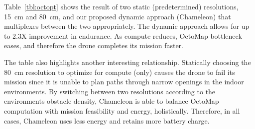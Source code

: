 Table~\ref{tbl:octopt} shows the result of two static (predetermined) resolutions, 15~cm and 80~cm, and our proposed dynamic approach (Chameleon) that multiplexes between the two appropriately. The dynamic approach allows for up to 2.3X improvement in endurance. As compute reduces, OctoMap bottleneck eases, and therefore the drone completes its mission faster. 

The table also highlights another interesting relationship. Statically choosing the 80~cm resolution to optimize for compute (only) causes the drone to fail its mission since it is unable to plan paths through narrow openings in the indoor environments. By switching between two resolutions according to the environments obstacle density, Chameleon is able to balance OctoMap computation with mission feasibility and energy, holistically. Therefore, in all cases, Chameleon uses less energy and retains more battery charge. \DIFdelbegin %


\DIFdelend